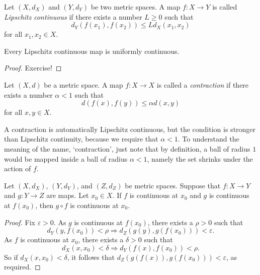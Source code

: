 \begin{definition}
Let $(X,d_X)$ and $(Y,d_Y)$ be two metric spaces. A map $f : X \to Y$ is
called \emph{Lipschitz continuous} if there exists
a number $L \ge 0$ such that
\[
d_Y(f(x_1),f(x_2)) \le Ld_X(x_1,x_2)
\]
for all $x_1,x_2 \in X$.
\end{definition}

\begin{theorem} \label{thm:Lipschitz}
Every Lipschitz continuous map is uniformly continuous.
\end{theorem}

\begin{proof}
Exercise!
\end{proof}


\begin{definition} \label{def:contraction}
Let $(X,d)$ be a metric space. A map $f : X \to X$ is called a \emph{contraction}
if there exists a number $\alpha < 1$ such that
\[
d(f(x),f(y)) \le \alpha d(x,y)
\]
for all $x,y \in X$.
\end{definition}

\np

\begin{remark}
A contraction is automatically Lipschitz continuous, but the
condition is stronger than Lipschitz continuity, because we
require that $\alpha < 1$. To understand the meaning of the name, `contraction', just note that by definition, a 
ball of radius $1$ would be mapped inside a ball of radius $\alpha<1$, namely the set shrinks under the action of $f$.
\end{remark}

\np

\begin{theorem}
Let $(X,d_X)$, $(Y,d_Y)$, and $(Z,d_Z)$ be metric spaces.
Suppose that $f : X \to Y$ and $g : Y \to Z$ are maps. Let $x_0 \in X$. If $f$ is continuous
at $x_0$ and $g$ is continuous at $f(x_0)$, then $g \circ f$ is continuous at $x_0$.
\end{theorem}

\begin{proof}
Fix $\varepsilon > 0$. As $g$ is continuous at $f(x_0)$, there exists a $\rho > 0$ such
that
\[
d_Y(y,f(x_0)) < \rho \Rightarrow d_Z(g(y),g(f(x_0))) < \varepsilon.
\]
As $f$ is continuous at $x_0$, there exists a $\delta > 0$ such that
\[
d_X(x,x_0) < \delta \Rightarrow d_Y(f(x),f(x_0)) < \rho.
\]
So if $d_X(x,x_0) < \delta$, it follows that
$d_Z(g(f(x)),g(f(x_0))) < \varepsilon$, as required.
\end{proof}

